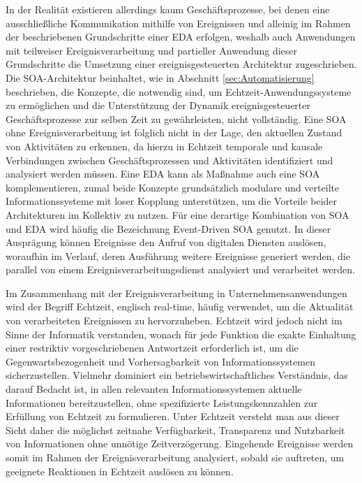 In der Realität existieren allerdings kaum Geschäftsprozesse, bei denen eine ausschließliche Kommunikation mithilfe von Ereignissen und alleinig im Rahmen der beschriebenen Grundschritte einer \ac{EDA} erfolgen, weshalb auch Anwendungen mit teilweiser Ereignisverarbeitung und partieller Anwendung dieser Grundschritte die Umsetzung einer ereignisgesteuerten Architektur zugeschrieben.
\cite{Etzion.2011}
Die \ac{SOA}-Architektur beinhaltet, wie in Abschnitt \ref{sec:Automatisierung} beschrieben, die Konzepte, die notwendig sind, um Echtzeit-Anwendungssysteme zu ermöglichen und die Unterstützung der Dynamik ereignisgesteuerter Geschäftsprozesse zur selben Zeit zu gewährleisten, nicht vollständig.
Eine \ac{SOA} ohne Ereignisverarbeitung ist folglich nicht in der Lage, den aktuellen Zustand von Aktivitäten zu erkennen, da hierzu in Echtzeit temporale und kausale Verbindungen zwischen Geschäftsprozessen und Aktivitäten identifiziert und analysiert werden müssen. 
Eine \ac{EDA} kann als Maßnahme auch eine \ac{SOA} komplementieren, zumal beide Konzepte grundsätzlich modulare und verteilte Informationssysteme mit loser Kopplung unterstützen, um die Vorteile beider Architekturen im Kollektiv zu nutzen. 
Für eine derartige Kombination von \ac{SOA} und \ac{EDA} wird häufig die Bezeichnung Event-Driven SOA genutzt.
In dieser Ausprägung können Ereignisse den Aufruf von digitalen Diensten auslösen, woraufhin im Verlauf, deren Ausführung weitere Ereignisse generiert werden, die parallel von einem Ereignisverarbeitungsdienst analysiert und verarbeitet werden. 
\cite{Bruns.2010}

Im Zusammenhang mit der Ereignisverarbeitung in Unternehmensanwendungen wird der Begriff Echtzeit, englisch real-time, häufig verwendet, um die Aktualität von verarbeiteten Ereignissen zu hervorzuheben.
\cite{Bruns.2015}
Echtzeit wird jedoch nicht im Sinne der Informatik verstanden, wonach für jede Funktion die exakte Einhaltung einer restriktiv vorgeschriebenen Antwortzeit erforderlich ist, um die Gegenwartsbezogenheit und Vorhersagbarkeit von Informationssystemen sicherzustellen.
Vielmehr dominiert ein betriebswirtschaftliches Verständnis, das darauf Bedacht ist, in allen relevanten Informationssystemen aktuelle Informationen bereitzustellen, ohne spezifizierte Leistungskennzahlen zur Erfüllung von Echtzeit zu formulieren.
\cite{Worn.2005}
Unter Echtzeit versteht man aus dieser Sicht daher die möglichst zeitnahe Verfügbarkeit, Transparenz und Nutzbarkeit von Informationen ohne unnötige Zeitverzögerung.
Eingehende Ereignisse werden somit im Rahmen der Ereignisverarbeitung analysiert, sobald sie auftreten, um geeignete Reaktionen in Echtzeit auslösen zu können.
\cite{Grauer.2010}

